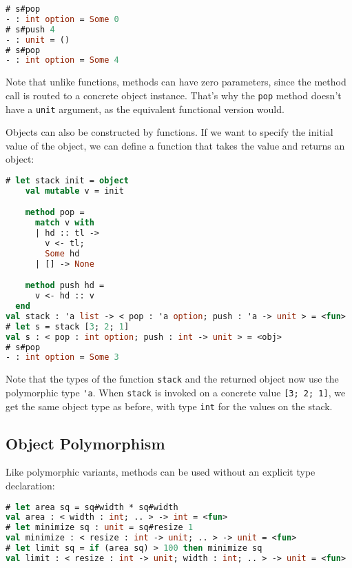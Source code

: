 \begin{lstlisting}[language=Caml]
# s#pop
- : int option = Some 0
# s#push 4
- : unit = ()
# s#pop
- : int option = Some 4
\end{lstlisting}

Note that unlike functions, methods can have zero parameters, since the
method call is routed to a concrete object instance. That's why the
\passthrough{\lstinline!pop!} method doesn't have a
\passthrough{\lstinline!unit!} argument, as the equivalent functional
version would.

Objects can also be constructed by functions. If we want to specify the
initial value of the object, we can define a function that takes the
value and returns an object:

\begin{lstlisting}[language=Caml]
# let stack init = object
    val mutable v = init

    method pop =
      match v with
      | hd :: tl ->
        v <- tl;
        Some hd
      | [] -> None

    method push hd =
      v <- hd :: v
  end
val stack : 'a list -> < pop : 'a option; push : 'a -> unit > = <fun>
# let s = stack [3; 2; 1]
val s : < pop : int option; push : int -> unit > = <obj>
# s#pop
- : int option = Some 3
\end{lstlisting}

Note that the types of the function \passthrough{\lstinline!stack!} and
the returned object now use the polymorphic type
\passthrough{\lstinline!'a!}. When \passthrough{\lstinline!stack!} is
invoked on a concrete value \passthrough{\lstinline![3; 2; 1]!}, we get
the same object type as before, with type \passthrough{\lstinline!int!}
for the values on the stack.

\hypertarget{object-polymorphism}{%
\subsection{Object Polymorphism}\label{object-polymorphism}}

Like polymorphic variants, methods can be used without an explicit type
declaration: 

\begin{lstlisting}[language=Caml]
# let area sq = sq#width * sq#width
val area : < width : int; .. > -> int = <fun>
# let minimize sq : unit = sq#resize 1
val minimize : < resize : int -> unit; .. > -> unit = <fun>
# let limit sq = if (area sq) > 100 then minimize sq
val limit : < resize : int -> unit; width : int; .. > -> unit = <fun>
\end{lstlisting}

